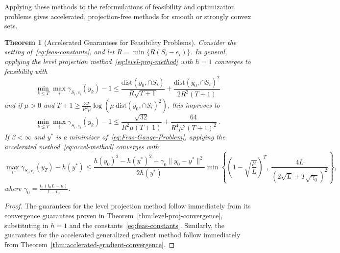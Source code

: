 \documentclass[sn-mathphys,Numbered]{sn-jnl}%
\newtheorem{theorem}{Theorem}%
\begin{document}
Applying these methods to the reformulations of feasibility and optimization problems gives accelerated, projection-free methods for smooth or strongly convex sets. 
\begin{theorem}[Accelerated Guarantees for Feasibility Problems] \label{thm:feas-rates}
    Consider the setting of~\eqref{eq:feas-constants}, and let $R=\min\{R(S_i - e_i)\}$. In general, applying the level projection method~\eqref{eq:level-proj-method} with $\bar h=1$ converges to feasibility with
    $$ \min_{k\leq T}\max_i \gamma_{S_i,e_i}(y_k) - 1 \leq
        \frac{\mathrm{dist}(y_0,\cap S_i)}{R\sqrt{T+1}} + \frac{\mathrm{dist}(y_0,\cap S_i)^2}{2R^2(T+1)} $$
    and if $\mu>0$ and $T+1 \geq \frac{32}{R^2\mu}\log(\mu\ \mathrm{dist}(y_0,\cap S_i)^2)$, this improves to
    $$ \min_{k\leq T}\max_i \gamma_{S_i,e_i}(y_k) - 1 \leq \frac{\sqrt{32}}{R^2\mu(T+1)} + \frac{64}{R^4\mu^2(T+1)^2}\ . $$
    If $\beta<\infty$ and $y^*$ is a minimizer of~\eqref{eq:Feas-Gauge-Problem}, applying the accelerated method~\eqref{eq:accel-method} converges with
    $$ \max_i \gamma_{S_i,e_i}(y_T) - h(y^*) \leq \frac{h(y_0)^2 - h(y^*)^2 + \gamma_0\|y_0-y^*\|^2}{2h(y^*)} \min\left\{\left(1-\sqrt{\frac{\mu}{L}}\right)^T,\ \frac{4L}{\left(2\sqrt{L} +T\sqrt{\gamma_0}\right)^2}\right\},$$
    where $\gamma_0=\frac{t_0(t_0L-\mu)}{1-t_0}$.
\end{theorem}
\begin{proof}
    The guarantees for the level projection method follow immediately from its convergence guarantees proven in Theorem~\ref{thm:level-proj-convergence}, substituting in $\bar h=1$ and the constants~\eqref{eq:feas-constants}. Similarly, the guarantees for the accelerated generalized gradient method follow immediately from Theorem~\ref{thm:acclerated-gradient-convergence}.
\end{proof}
\end{document}
